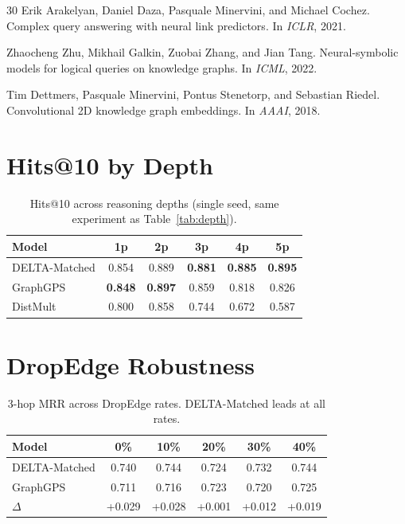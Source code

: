 \documentclass{article}
\begin{document}
\begin{thebibliography}{30}
Erik Arakelyan, Daniel Daza, Pasquale Minervini, and Michael Cochez.
\newblock Complex query answering with neural link predictors.
\newblock In \emph{ICLR}, 2021.

Zhaocheng Zhu, Mikhail Galkin, Zuobai Zhang, and Jian Tang.
\newblock Neural-symbolic models for logical queries on knowledge graphs.
\newblock In \emph{ICML}, 2022.

Tim Dettmers, Pasquale Minervini, Pontus Stenetorp, and Sebastian Riedel.
\newblock Convolutional 2D knowledge graph embeddings.
\newblock In \emph{AAAI}, 2018.

\end{thebibliography}

\newpage
\appendix

\section{Hits@10 by Depth}
\label{app:hits10}

\begin{table}[h]
\centering
\caption{Hits@10 across reasoning depths (single seed, same experiment as Table~\ref{tab:depth}).}
\label{tab:hits10_depth}
\begin{tabular}{@{}lccccc@{}}
\toprule
\textbf{Model} & \textbf{1p} & \textbf{2p} & \textbf{3p} & \textbf{4p} & \textbf{5p} \\
\midrule
DELTA-Matched & 0.854 & 0.889 & \textbf{0.881} & \textbf{0.885} & \textbf{0.895} \\
GraphGPS & \textbf{0.848} & \textbf{0.897} & 0.859 & 0.818 & 0.826 \\
DistMult & 0.800 & 0.858 & 0.744 & 0.672 & 0.587 \\
\bottomrule
\end{tabular}
\end{table}

\section{DropEdge Robustness}
\label{app:dropedge}

\begin{table}[h]
\centering
\caption{3-hop MRR across DropEdge rates. DELTA-Matched leads at all rates.}
\label{tab:dropedge}
\begin{tabular}{@{}lccccc@{}}
\toprule
\textbf{Model} & \textbf{0\%} & \textbf{10\%} & \textbf{20\%} & \textbf{30\%} & \textbf{40\%} \\
\midrule
DELTA-Matched & 0.740 & 0.744 & 0.724 & 0.732 & 0.744 \\
GraphGPS & 0.711 & 0.716 & 0.723 & 0.720 & 0.725 \\
\midrule
$\Delta$ & +0.029 & +0.028 & +0.001 & +0.012 & +0.019 \\
\bottomrule
\end{tabular}
\end{table}
\end{document}
